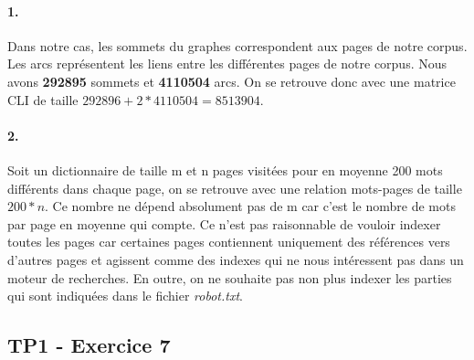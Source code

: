 \documentclass[10pt,a4paper]{article}
\begin{document}
\paragraph{1.} Dans notre cas, les sommets du graphes correspondent aux pages de notre corpus. Les arcs représentent les liens entre les différentes pages de notre corpus. Nous avons \textbf{292895} sommets et \textbf{4110504} arcs. On se retrouve donc avec une matrice CLI de taille $292 896 + 2 * 4 110 504 = 8 513 904$.

\paragraph{2.} Soit un dictionnaire de taille m et n pages visitées pour en moyenne 200 mots différents dans chaque page, on se retrouve avec une relation mots-pages de taille $200 * n$. Ce nombre ne dépend absolument pas de m car c'est le nombre de mots par page en moyenne qui compte. Ce n'est pas raisonnable de vouloir indexer toutes les pages car certaines pages contiennent uniquement des références vers d'autres pages et agissent comme des indexes qui ne nous intéressent pas dans un moteur de recherches. En outre, on ne souhaite pas non plus indexer les parties qui sont indiquées dans le fichier \textit{robot.txt}.

\subsection{TP1 - Exercice 7}
\end{document}
